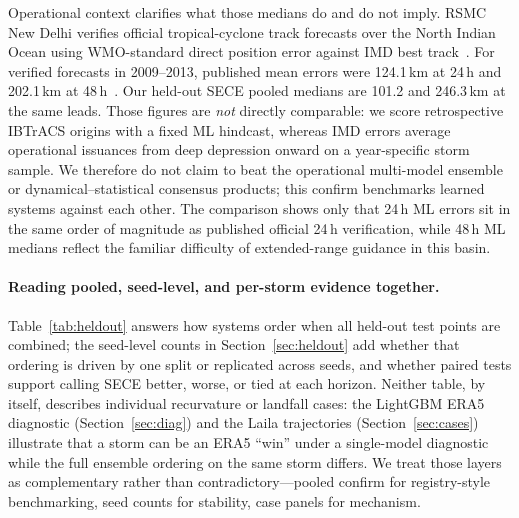 \documentclass[10pt,twocolumn,a4paper]{article}
\newcommand{\sece}{SECE}
\newcommand{\era}{ERA5}
\newcommand{\ibtracs}{IBTrACS}
\begin{document}
Operational context clarifies what those medians do and do not imply. RSMC New
Delhi verifies official tropical-cyclone track forecasts over the North Indian
Ocean using WMO-standard direct position error against IMD best
track~\cite{mohapatra2013imdtrack}. For verified forecasts in 2009--2013,
published mean errors were 124.1\,km at 24\,h and 202.1\,km at
48\,h~\cite{mohapatra2013imdtrack}. Our held-out \sece{} pooled medians are
101.2 and 246.3\,km at the same leads. Those figures are \emph{not} directly
comparable: we score retrospective \ibtracs{} origins with a fixed ML hindcast,
whereas IMD errors average operational issuances from deep depression onward on a
year-specific storm sample. We therefore do not claim to beat the operational
multi-model ensemble or dynamical--statistical consensus products; this confirm
benchmarks learned systems against each other. The comparison shows only that
24\,h ML errors sit in the same order of magnitude as published official
24\,h verification, while 48\,h ML medians reflect the familiar difficulty of
extended-range guidance in this basin.

\paragraph{Reading pooled, seed-level, and per-storm evidence together.}
Table~\ref{tab:heldout} answers how systems order when all held-out test points
are combined; the seed-level counts in Section~\ref{sec:heldout} add whether that
ordering is driven by one split or replicated across seeds, and whether paired
tests support calling \sece{} better, worse, or tied at each horizon. Neither table, by itself, describes
individual recurvature or landfall cases: the LightGBM \era{} diagnostic
(Section~\ref{sec:diag}) and the Laila trajectories (Section~\ref{sec:cases})
illustrate that a storm can be an \era{} ``win'' under a single-model diagnostic
while the full ensemble ordering on the same storm differs. We treat those layers
as complementary rather than contradictory---pooled confirm for registry-style
benchmarking, seed counts for stability, case panels for mechanism.
\end{document}
